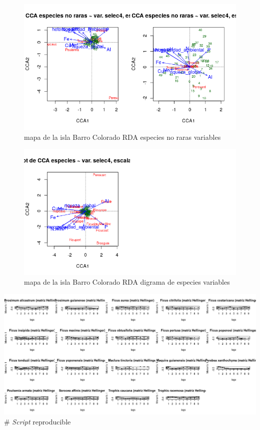\documentclass[11pt,]{article}
\begin{document}
\begin{figure}
\centering
\includegraphics[width=1.00000\textwidth]{rda_escalamiento_escala_5.png}
\caption{mapa de la isla Barro Colorado RDA especies no raras
variables\label{fig:bci_map}}
\end{figure}

\begin{figure}
\centering
\includegraphics[width=1.00000\textwidth]{rda_especies_escala_4.png}
\caption{mapa de la isla Barro Colorado RDA digrama de especies
variables\label{fig:bci_map}}
\end{figure}

\includegraphics[width=1.00000\textwidth]{multiples_especies.png} \#
\emph{Script} reproducible
\end{document}
